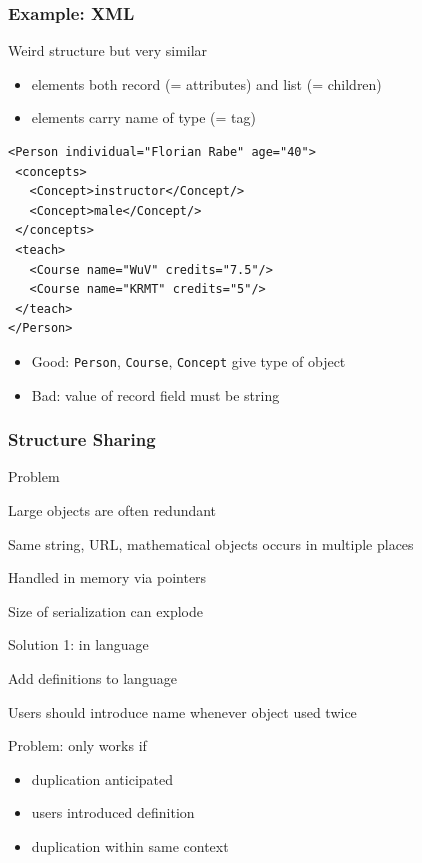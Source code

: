 \documentclass{beamer}
\begin{document}
\begin{frame}[fragile]\frametitle{Example: XML}
Weird structure but very similar
\begin{itemize}
\item elements both record (= attributes) and list (= children)
\item elements carry name of type (= tag)
\end{itemize}

\begin{lstlisting}[basicstyle=\footnotesize]
<Person individual="Florian Rabe" age="40">
 <concepts>
   <Concept>instructor</Concept/>
   <Concept>male</Concept/>
 </concepts>
 <teach>
   <Course name="WuV" credits="7.5"/>
   <Course name="KRMT" credits="5"/>
 </teach>
</Person>
\end{lstlisting}

\begin{itemize}
\item Good: \lstinline|Person|, \lstinline|Course|, \lstinline|Concept| give type of object
\item Bad: value of record field must be string
\end{itemize}
\end{frame}

\begin{frame}\frametitle{Structure Sharing}
\begin{blockitems}{Problem}
\item Large objects are often redundant
\item Same string, URL, mathematical objects occurs in multiple places
\item Handled in memory via pointers
\item Size of serialization can explode
\end{blockitems}

\begin{blockitems}{Solution 1: in language}
\item Add definitions to language
\item Users should introduce name whenever object used twice
\item Problem: only works if 
 \begin{itemize}
  \item duplication anticipated
  \item users introduced definition
  \item duplication within same context
 \end{itemize}
\end{blockitems}
\end{frame}
\end{document}
